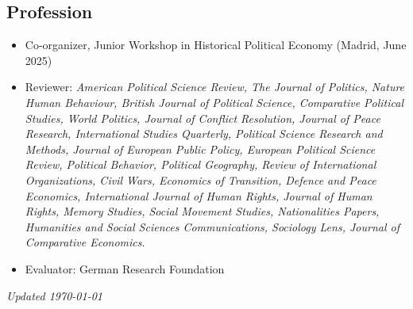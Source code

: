 \documentclass[a4paper, 12pt]{article}
\begin{document}
\subsection*{Profession}

\begin{itemize}[leftmargin=*, nolistsep]
	\item Co-organizer, Junior Workshop in Historical Political Economy (Madrid, June 2025)
	\item Reviewer: \textit{American Political Science Review, The Journal of Politics, Nature Human Behaviour, British Journal of Political Science, Comparative Political Studies, World Politics, Journal of Conflict Resolution, Journal of Peace Research, International Studies Quarterly, Political Science Research and Methods, Journal of European Public Policy, European Political Science Review, Political Behavior, Political Geography, Review of International Organizations, Civil Wars, Economics of Transition, Defence and Peace Economics, International Journal of Human Rights, Journal of Human Rights, Memory Studies, Social Movement Studies, Nationalities Papers, Humanities and Social Sciences Communications, Sociology Lens, Journal of Comparative Economics}.
	\item Evaluator: German Research Foundation
\end{itemize}

\vspace{-10pt}
\noindent
\flushright
{\small\it Updated \monthdate\today}
\end{document}
